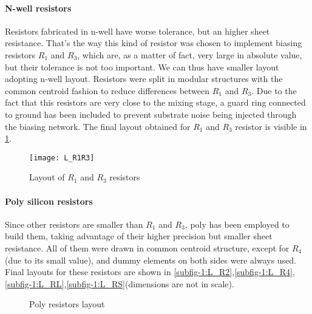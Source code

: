 \paragraph{N-well resistors}
Resistors fabricated in n-well have worse tolerance, but an higher sheet resistance. That's the way this kind of resistor was chosen to implement biasing resistors \(R_1\) and \(R_3\), which are, as a matter of fact, very large in absolute value, but their tolerance is not too important. We can thus have smaller layout adopting n-well layout. Resistors were split in modular structures with the common centroid fashion to reduce differences between \(R_1\) and \(R_3\). Due to the fact that this resistors are very close to the mixing stage, a guard ring connected to ground has been included to prevent substrate noise being injected through the biasing network. The final layout obtained for \(R_1\) and \(R_3\) resistor is visible in \ref{L_R1R3}.
 
\begin{figure}[H]
	\centering
	\texttt{[image: L\_R1R3]}
	\caption{Layout of $R_1$ and $R_3$ resistors}
	\label{L_R1R3}
\end{figure}

\paragraph{Poly silicon resistors}
Since other resistors are smaller than \(R_1\) and \(R_3\), poly has been employed to build them, taking advantage of their higher precision but smaller sheet resistance. All of them were drawn in common centroid structure, except for \(R_4\) (due to its small value), and dummy elements on both sides were always used. Final layouts for these resistors are shown in \ref{subfig-1:L_R2},\ref{subfig-1:L_R4},\ref{subfig-1:L_RL},\ref{subfig-1:L_RS}(dimensions are not in scale).

\begin{figure}[H]
	\centering
	
	\vfill
	\hfil
	\caption{Poly resistors layout}
\end{figure}

